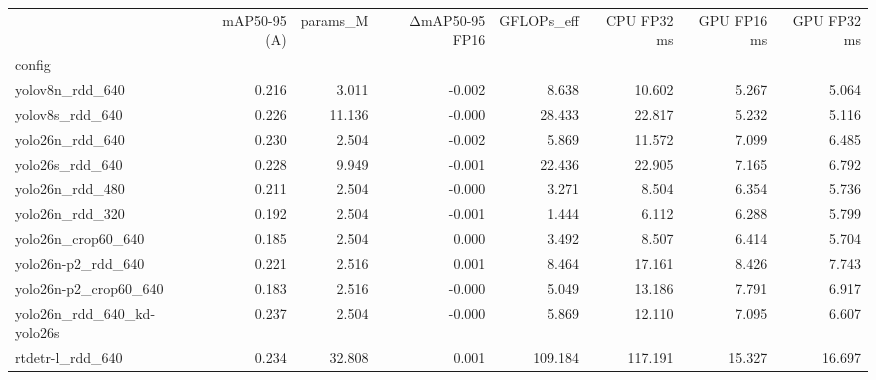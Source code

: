 \begin{tabular}{lrrrrrrr}
\toprule
 & mAP50-95 (A) & params\_M & ΔmAP50-95 FP16 & GFLOPs\_eff & CPU FP32 ms & GPU FP16 ms & GPU FP32 ms \\
config &  &  &  &  &  &  &  \\
\midrule
yolov8n\_rdd\_640 & 0.216 & 3.011 & -0.002 & 8.638 & 10.602 & 5.267 & 5.064 \\
yolov8s\_rdd\_640 & 0.226 & 11.136 & -0.000 & 28.433 & 22.817 & 5.232 & 5.116 \\
yolo26n\_rdd\_640 & 0.230 & 2.504 & -0.002 & 5.869 & 11.572 & 7.099 & 6.485 \\
yolo26s\_rdd\_640 & 0.228 & 9.949 & -0.001 & 22.436 & 22.905 & 7.165 & 6.792 \\
yolo26n\_rdd\_480 & 0.211 & 2.504 & -0.000 & 3.271 & 8.504 & 6.354 & 5.736 \\
yolo26n\_rdd\_320 & 0.192 & 2.504 & -0.001 & 1.444 & 6.112 & 6.288 & 5.799 \\
yolo26n\_crop60\_640 & 0.185 & 2.504 & 0.000 & 3.492 & 8.507 & 6.414 & 5.704 \\
yolo26n-p2\_rdd\_640 & 0.221 & 2.516 & 0.001 & 8.464 & 17.161 & 8.426 & 7.743 \\
yolo26n-p2\_crop60\_640 & 0.183 & 2.516 & -0.000 & 5.049 & 13.186 & 7.791 & 6.917 \\
yolo26n\_rdd\_640\_kd-yolo26s & 0.237 & 2.504 & -0.000 & 5.869 & 12.110 & 7.095 & 6.607 \\
rtdetr-l\_rdd\_640 & 0.234 & 32.808 & 0.001 & 109.184 & 117.191 & 15.327 & 16.697 \\
\bottomrule
\end{tabular}
